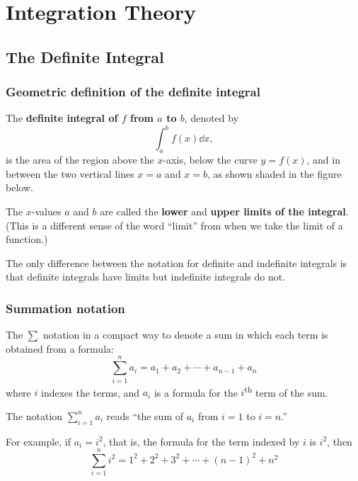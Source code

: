 \chapter{Integration Theory}
\section{The Definite Integral}
\subsection{Geometric definition of the definite integral}
The \textbf{definite integral of $f$ from $a$ to $b$}, denoted by
\[\int_a^bf(x)\dd x,\]
is the area of the region above the $x$-axis, below the curve $y=f(x)$, and in between the two vertical lines $x=a$ and $x=b$, as shown shaded in the figure below.

The $x$-values $a$ and $b$ are called the \textbf{lower} and \textbf{upper limits of the integral}. (This is a different sense of the word ``limit'' from when we take the limit of a function.)

The only difference between the notation for definite and indefinite integrals is that definite integrals have limits but indefinite integrals do not.
\subsection{Summation notation}
The $\sum$ notation in a compact way to denote a sum in which each term is obtained from a formula:
\[\sum_{i=1}^na_i=a_1+a_2+\cdots+a_{n-1}+a_n\]
where $i$ indexes the terms, and $a_i$ is a formula for the $i$\textsuperscript{th} term of the sum.

The notation $\sum_{i=1}^na_i$ reads ``the sum of $a_i$ from $i=1$ to $i=n$.''

For example, if $a_i=i^2$, that is, the formula for the term indexed by $i$ is $i^2$, then
\[\sum_{i=1}^ni^2=1^2+2^2+3^2+\cdots+(n-1)^2+n^2\]
